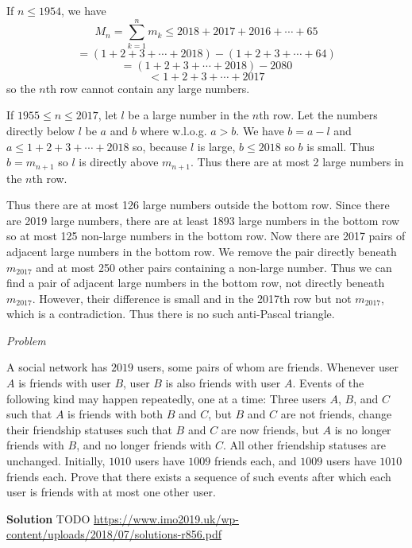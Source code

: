 \begin{problem}
If $n\leq 1954$, we have\[M_n=\sum_{k=1}^n m_k \leq 2018+2017+2016+\cdots+65\]\[=(1+2+3+\cdots+2018)-(1+2+3+\cdots+64)\]\[=(1+2+3+\cdots+2018)-2080\]\[<1+2+3+\cdots+2017\]so the $n$th row cannot contain any large numbers.

If $1955\leq n\leq 2017$, let $l$ be a large number in the $n$th row. Let the numbers directly below $l$ be $a$ and $b$ where w.l.o.g. $a>b$. We have $b=a-l$ and $a\leq 1+2+3+\cdots+2018$ so, because $l$ is large, $b\leq 2018$ so $b$ is small. Thus $b=m_{n+1}$ so $l$ is directly above $m_{n+1}$. Thus there are at most 2 large numbers in the $n$th row.

Thus there are at most 126 large numbers outside the bottom row. Since there are 2019 large numbers, there are at least 1893 large numbers in the bottom row so at most 125 non-large numbers in the bottom row. Now there are 2017 pairs of adjacent large numbers in the bottom row. We remove the pair directly beneath $m_{2017}$ and at most 250 other pairs containing a non-large number. Thus we can find a pair of adjacent large numbers in the bottom row, not directly beneath $m_{2017}$. However, their difference is small and in the 2017th row but not $m_{2017}$, which is a contradiction. Thus there is no such anti-Pascal triangle.
\end{problem}


\begin{problem}
[IMO2019PL3]
\textit{Problem}


A social network has $2019$ users, some pairs of whom are friends. Whenever user $A$ is friends with user $B$, user $B$ is also friends with user $A$. Events of the following kind may happen repeatedly, one at a time: Three users $A$, $B$, and $C$ such that $A$ is friends with both $B$ and $C$, but $B$ and $C$ are not friends, change their friendship statuses such that $B$ and $C$ are now friends, but $A$ is no longer friends with $B$, and no longer friends with $C$. All other friendship statuses are unchanged. Initially, $1010$ users have $1009$ friends each, and $1009$ users have $1010$ friends each. Prove that there exists a sequence of such events after which each user is friends with at most one other user.

\textbf{Solution}
TODO
\url{https://www.imo2019.uk/wp-content/uploads/2018/07/solutions-r856.pdf}
\end{problem}

